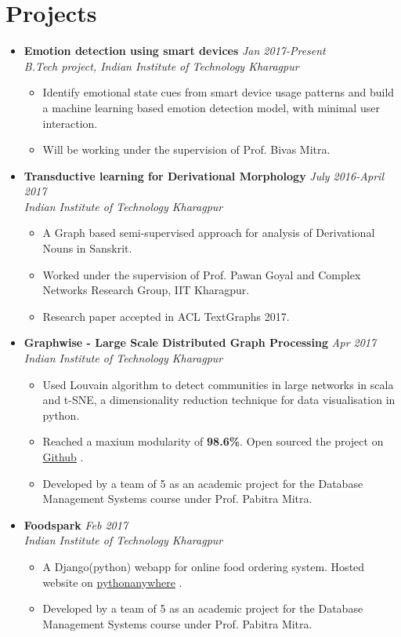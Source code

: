 \documentclass[10pt,a4paper]{moderncv}
\newcommand{\experience}[4]{
  \vspace{0.1cm}
  \item \textbf{\large{#1}} \hfill\textit{#3}\\\textit{#2}
  \begin{itemize}[leftmargin=*]
    \setlength\itemsep{0em} #4
  \end{itemize}
}
\newcommand{\newlink}[2]{
  \href{#1}{\color{blue}#2}
}
\begin{document}
\vspace{-0.1cm}
\section*{Projects}
\begin{itemize}
  \setlength\itemsep{0.5em}

  \experience{Emotion detection using smart devices}{B.Tech project, Indian Institute of Technology Kharagpur}{Jan 2017-Present}{
  	\item Identify emotional state cues from smart device usage patterns and build a machine learning based emotion detection model, with minimal user interaction.
  	\item Will be working under the supervision of Prof. Bivas Mitra.
  }

  \experience{Transductive learning for Derivational Morphology}{Indian Institute of Technology Kharagpur}{July 2016-April 2017}{
    \item A Graph based semi-supervised approach for analysis of Derivational Nouns in Sanskrit.
    \item	Worked under the supervision of Prof. Pawan Goyal and Complex Networks Research Group, IIT Kharagpur.
    \item Research paper accepted in ACL TextGraphs 2017.
  }

  \experience{Graphwise - Large Scale Distributed Graph Processing}{Indian Institute of Technology Kharagpur}{Apr 2017}{
  	\item Used Louvain algorithm to detect communities in large networks in scala and t-SNE, a dimensionality reduction technique for data visualisation in python.
  	\item Reached a maxium modularity of \textbf{98.6\%}. Open sourced the project on \newlink{https://github.com/kaustubhhiware/Graphwise}{Github}.
  	\item Developed by a team of 5 as an academic project for the Database Management Systems course under Prof. Pabitra Mitra.
  }

  \experience{Foodspark}{Indian Institute of Technology Kharagpur}{Feb 2017}{
  	\item A Django(python) webapp for online food ordering system. Hosted website on \newlink{http://foodkgp.pythonanywhere.com/}{pythonanywhere}.
  	\item Developed by a team of 5 as an academic project for the Database Management Systems course under Prof. Pabitra Mitra.
  }
 

\end{itemize}
\end{document}
